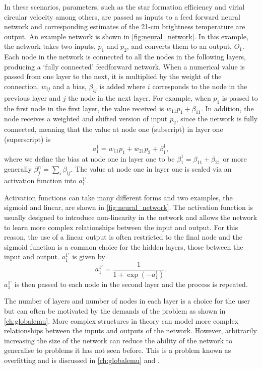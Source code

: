 In these scenarios, parameters, such as the star formation efficiency and virial circular velocity among others, are passed as inputs to a feed forward neural network and corresponding estimates of the 21-cm brightness temperature are output. An example network is shown in \cref{fig:neural_network}. In this example, the network takes two inputs, $p_1$ and $p_2$, and converts them to an output, $O_1$. Each node in the network is connected to all the nodes in the following layers, producing a `fully connected' feedforward network. When a numerical value is passed from one layer to the next, it is multiplied by the weight of the connection, $w_{ij}$ and a bias, $\beta_{ij}$ is added where $i$ corresponds to the node in the previous layer and $j$ the node in the next layer. For example, when $p_1$ is passed to the first node in the first layer, the value received is $w_{11} p_1 + \beta_{11}$. In addition, the node receives a weighted and shifted version of input $p_2$, since the network is fully connected, meaning that the value at node one (subscript) in layer one (superscript) is
\begin{equation}
    a_1^1 = w_{11} p_1 + w_{21} p_2 + \beta^1_1,
\end{equation}
where we define the bias at node one in layer one to be $\beta_1^1 = \beta_{11} + \beta_{21}$ or more generally $\beta_j^n =\sum_i \beta_{ij}$. The value at node one in layer one is scaled via an activation function into $a^{1 \prime}_1$. 

Activation functions can take many different forms and two examples, the sigmoid and linear, are shown in \cref{fig:neural_network}. The activation function is usually designed to introduce non-linearity in the network and allows the network to learn more complex relationships between the input and output. For this reason, the use of a linear output is often restricted to the final node and the sigmoid function is a common choice for the hidden layers, those between the input and output. $a^{1 \prime}_1$ is given by
\begin{equation}
    a^{1 \prime}_1 = \frac{1}{1+\exp(-a_{1}^1)}.
\end{equation}
$a^{1 \prime}_1$ is then passed to each node in the second layer and the process is repeated.

The number of layers and number of nodes in each layer is a choice for the user but can often be motivated by the demands of the problem as shown in \cref{ch:globalemu}. More complex structures in theory can model more complex relationships between the inputs and outputs of the network. However, arbitrarily increasing the size of the network can reduce the ability of the network to generalise to problems it has not seen before. This is a problem known as overfitting and is discussed in \cref{ch:globalemu} and \cite{Bevins_globalemu_2021}.

